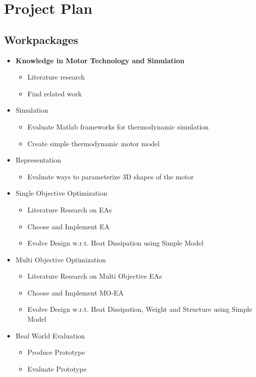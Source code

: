 \documentclass[12pt]{article}
\begin{document}
\section{Project Plan}
\subsection{Workpackages}
\begin{itemize}
	\item \textbf{Knowledge in Motor Technology and Simulation}
	\begin{itemize}
		\item Literature research
		\item Find related work
	\end{itemize}

	\item Simulation
	\begin{itemize}
		\item Evaluate Matlab frameworks for thermodynamic simulation
		\item Create simple thermodynamic motor model 
	\end{itemize}

	\item Representation
	\begin{itemize}
		\item Evaluate ways to parameterize 3D shapes of the motor
	\end{itemize}		
	
	\item Single Objective Optimization
	\begin{itemize}
		\item Literature Research on EAs
		\item Choose and Implement EA
		\item Evolve Design w.r.t. Heat Dissipation using Simple Model
	\end{itemize}
	
	\item Multi Objective Optimization
	\begin{itemize}
		\item Literature Research on Multi Objective EAs
		\item Choose and Implement MO-EA
		\item Evolve Design w.r.t. Heat Dissipation, Weight and Structure using Simple Model
	\end{itemize}
	
	\item Real World Evaluation
	\begin{itemize}
		\item Produce Prototype
		\item Evaluate Prototype
	\end{itemize}
	
\end{itemize}

\newpage
\nocite{*}


\end{document}
